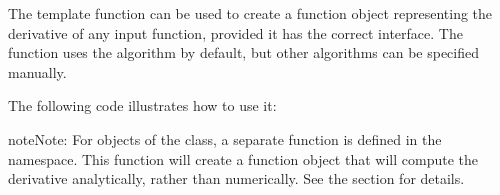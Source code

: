 \documentclass[letterpaper,10pt,english]{sphinxmanual}
\begin{document}
\sphinxAtStartPar
The  template function can be used to create a function object representing the derivative of
any input function, provided it has the correct interface. The function uses the 
algorithm by default, but other algorithms can be specified manually.

\sphinxAtStartPar
The following code illustrates how to use it:

\begin{sphinxVerbatim}[commandchars=\\\{\}]

\PYG{p}{[}\PYG{p}{]}

\end{sphinxVerbatim}

\begin{sphinxadmonition}{note}{Note:}
\sphinxAtStartPar
For objects of the  class, a separate  function is defined in the
 namespace. This function will create a function object that will compute the derivative
analytically, rather than numerically. See the {\hyperref[\detokenize{docPolynomial:polynomials}]{}} section for details.
\end{sphinxadmonition}
\end{document}
